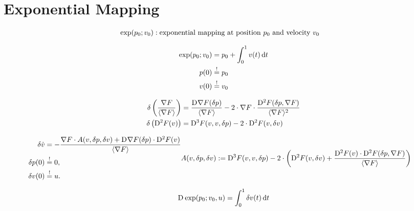 \section{Exponential Mapping}


\begin{subequations}
\begin{align}
\exp( p_0; v_0 )  &:  \text{exponential mapping at position $ p_0 $ and velocity $ v_0 $}
\end{align}
\end{subequations}


\begin{subequations}
\begin{align}
\exp( p_0; v_0 )  &=  p_0  +  \int^1_0 v( t ) \,\mathrm{ d }{  t  }\\
p( 0 )  &\overset{ ! }{ = }   p_0\\
v( 0 )  &\overset{ ! }{ = }   v_0
\end{align}
\end{subequations}




\begin{subequations}
\begin{align}
\delta \left( \frac{ \nabla F  }{ \langle  \nabla F   \rangle } \right)  &=
\frac{ \mathrm{D}^{  } \nabla F  ( \delta p ) }{ \langle  \nabla F   \rangle }  -
2 \cdot \nabla F  \cdot \frac{ \mathrm{D}^{  2  } F ( \delta p, \nabla F  ) }{ \langle  \nabla F   \rangle^2 }\\
\delta\left( \mathrm{D}^{  2  } F ( v ) \right)  &=
\mathrm{D}^{  3  } F ( v, v, \delta p )  -  2 \cdot \mathrm{D}^{  2  } F ( v, \delta v )
\end{align}
\end{subequations}


\begin{subequations}
\begin{align}
\delta \dot{ v }   &=
- \frac{ \grad F \mult A( v, \delta p, \delta v  )
+  \diff{}{ \grad{ F } }( \delta p ) \mult \diff{ 2 }{ F }( v ) }{ \skaq{ \grad{ F } } } \\
\delta p( 0 )  &\overset{ ! }{ = }  0,\\
\delta v( 0 )  &\overset{ ! }{ = }  u.
\end{align}

\begin{align}
A( v, \delta p, \delta v  )  &:=
\diff{ 3 }{ F }( v, v, \delta p ) -
         2 \mult \left( \diff{ 2 }{ F }( v, \delta v ) +
                        \frac{ \diff{ 2 }{ F }( v ) \mult \diff{ 2 }{ F }( \delta p, \grad{ F } )
                                       }{ \skaq{ \grad{ F } } } \right)
\end{align}
\end{subequations}



\begin{align}
\mathrm{D}^{  } \exp( p_0; v_0, u )  =  \int^1_0 \delta v( t ) \,\mathrm{ d }{  t  }
\end{align}
